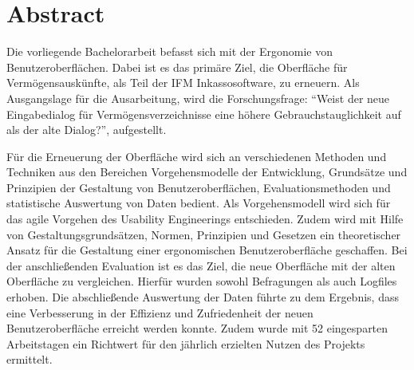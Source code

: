 \section{Abstract}
Die vorliegende Bachelorarbeit befasst sich mit der Ergonomie von Benutzeroberflächen. Dabei ist es das primäre Ziel, die Oberfläche für Vermögensauskünfte, als Teil der IFM Inkassosoftware, zu erneuern. Als Ausgangslage für die Ausarbeitung, wird die Forschungsfrage: \enquote{Weist der neue Eingabedialog für Vermögensverzeichnisse eine höhere Gebrauchstauglichkeit auf als der alte Dialog?}, aufgestellt.

Für die Erneuerung der Oberfläche wird sich an verschiedenen Methoden und Techniken aus den Bereichen Vorgehensmodelle der Entwicklung, Grundsätze und Prinzipien der Gestaltung von Benutzeroberflächen, Evaluationsmethoden und statistische Auswertung von Daten bedient. Als Vorgehensmodell wird sich für das agile Vorgehen des Usability Engineerings entschieden. Zudem wird mit Hilfe von Gestaltungsgrundsätzen, Normen, Prinzipien und Gesetzen ein theoretischer Ansatz für die Gestaltung einer ergonomischen Benutzeroberfläche geschaffen. Bei der anschließenden Evaluation ist es das Ziel, die neue Oberfläche mit der alten Oberfläche zu vergleichen. Hierfür wurden sowohl Befragungen als auch Logfiles erhoben. Die abschließende Auswertung der Daten führte zu dem Ergebnis, dass eine Verbesserung in der Effizienz und Zufriedenheit der neuen Benutzeroberfläche erreicht werden konnte. Zudem wurde mit 52 eingesparten Arbeitstagen ein Richtwert für den jährlich erzielten Nutzen des Projekts ermittelt.